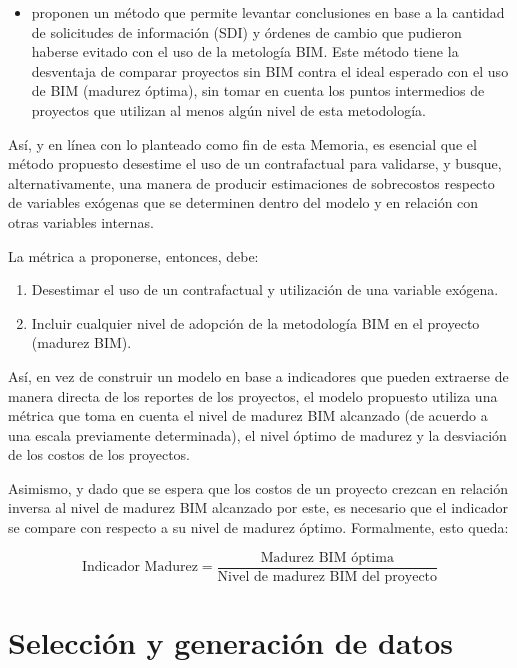 \begin{itemize}
    \item {} proponen un método que permite levantar conclusiones en base a la cantidad de solicitudes de información (SDI) y órdenes de cambio que pudieron haberse evitado con el uso de la metología BIM. Este método tiene la desventaja de comparar proyectos sin BIM contra el ideal esperado con el uso de BIM (madurez óptima), sin tomar en cuenta los puntos intermedios de proyectos que utilizan al menos algún nivel de esta metodología.
\end{itemize}


Así, y en línea con lo planteado como fin de esta Memoria, es esencial que el método propuesto desestime el uso de un contrafactual para validarse, y busque, alternativamente, una manera de producir estimaciones de sobrecostos respecto de variables exógenas que se determinen dentro del modelo y en relación con otras variables internas.

La métrica a proponerse, entonces, debe:

\begin{enumerate}
    \item Desestimar el uso de un contrafactual y utilización de una variable exógena.
    \item Incluir cualquier nivel de adopción de la metodología BIM en el proyecto (madurez BIM).
\end{enumerate}

Así, en vez de construir un modelo en base a indicadores que pueden extraerse de manera directa de los reportes de los proyectos, el modelo propuesto utiliza una métrica que toma en cuenta el nivel de madurez BIM alcanzado (de acuerdo a una escala previamente determinada), el nivel óptimo de madurez y la desviación de los costos de los proyectos.

Asimismo, y dado que se espera que los costos de un proyecto crezcan en relación inversa al nivel de madurez BIM alcanzado por este, es necesario que el indicador se compare con respecto a su nivel de madurez óptimo. Formalmente, esto queda:

\begin{equation}
    \text{Indicador Madurez} = \frac{\text{Madurez BIM óptima}}{\text{Nivel de madurez BIM del proyecto}}
    \label{eq:indicador-propuesto}
\end{equation}

\section{Selección y generación de datos}

